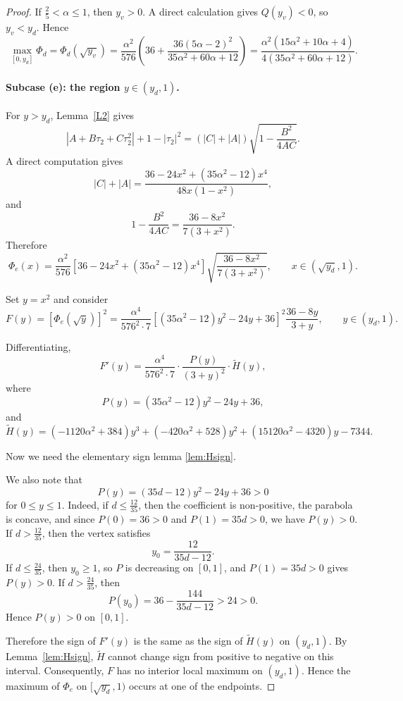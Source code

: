 \documentclass[11pt,reqno]{amsart}
\numberwithin{equation}{section}
\begin{document}
\begin{proof}
If $\frac25<\alpha\le 1$, then $y_v>0$. A direct calculation gives $Q(y_v)<0$, so $y_v<y_d$. Hence
\[
\max_{[0,y_d]}\Phi_d
=
\Phi_d(\sqrt{y_v})
=
\frac{\alpha^2}{576}
\left(
36+\frac{36(5\alpha-2)^2}{35\alpha^2+60\alpha+12}
\right)
=
\frac{\alpha^2(15\alpha^2+10\alpha+4)}
{4(35\alpha^2+60\alpha+12)}.
\]

\paragraph{Subcase (e): the region $y\in(y_d,1)$.}
For $y>y_d$, Lemma~\ref{L2} gives
\[
|A+B\tau_2+C\tau_2^2|+1-|\tau_2|^2
=
(|C|+|A|)\sqrt{1-\frac{B^2}{4AC}}.
\]
A direct computation gives
\[
|C|+|A|
=
\frac{36-24x^2+(35\alpha^2-12)x^4}{48x(1-x^2)},
\]
and
\[
1-\frac{B^2}{4AC}
=
\frac{36-8x^2}{7(3+x^2)}.
\]
Therefore
\begin{equation}\label{phi_e_correct}
\Phi_e(x)
=
\frac{\alpha^2}{576}
\left[
36-24x^2+(35\alpha^2-12)x^4
\right]
\sqrt{\frac{36-8x^2}{7(3+x^2)}},
\qquad x\in(\sqrt{y_d},1).
\end{equation}

Set $y=x^2$ and consider
\[
F(y)=[\Phi_e(\sqrt{y})]^2
=
\frac{\alpha^4}{576^2\cdot 7}
\left[
(35\alpha^2-12)y^2-24y+36
\right]^2
\frac{36-8y}{3+y},
\qquad y\in(y_d,1).
\]

Differentiating,
\[
F'(y)
=
\frac{\alpha^4}{576^2\cdot 7}
\cdot
\frac{P(y)}{(3+y)^2}
\cdot
\widetilde H(y),
\]
where
\[
P(y)=(35\alpha^2-12)y^2-24y+36,
\]
and
\begin{equation}\label{Htilde}
\widetilde H(y)
=
(-1120\alpha^2+384)y^3
+
(-420\alpha^2+528)y^2
+
(15120\alpha^2-4320)y
-
7344.
\end{equation}

Now we need the elementary sign lemma \eqref{lem:Hsign}.

We also note that
\[
P(y)=(35d-12)y^2-24y+36>0
\]
for $0\le y\le1$. Indeed, if $d\le \frac{12}{35}$, then the coefficient is non-positive, the parabola is concave, and since $P(0)=36>0$ and $P(1)=35d>0$, we have $P(y)>0$. If $d>\frac{12}{35}$, then the vertex satisfies
\[
y_0=\frac{12}{35d-12}.
\]
If $d\le \frac{24}{35}$, then $y_0\ge1$, so $P$ is decreasing on $[0,1]$, and $P(1)=35d>0$ gives $P(y)>0$. If $d>\frac{24}{35}$, then
\[
P(y_0)=36-\frac{144}{35d-12}>24>0.
\]
Hence $P(y)>0$ on $[0,1]$.

Therefore the sign of $F'(y)$ is the same as the sign of $\widetilde H(y)$ on $(y_d,1)$. By Lemma~\ref{lem:Hsign}, $\widetilde H$ cannot change sign from positive to negative on this interval. Consequently, $F$ has no interior local maximum on $(y_d,1)$. Hence the maximum of $\Phi_e$ on $[\sqrt{y_d},1)$ occurs at one of the endpoints.


\end{proof}
\end{document}

